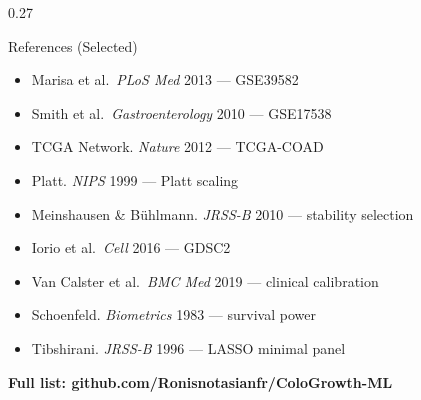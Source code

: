 \documentclass[final]{beamer}
\begin{document}
\begin{frame}[t]
\begin{columns}[t]
\begin{column}{0.27\textwidth}
\vspace*{0.15cm}

\begin{block}{References (Selected)}
\footnotesize
\begin{itemize}
\item Marisa et al.\ \emph{PLoS Med} 2013 --- GSE39582
\item Smith et al.\ \emph{Gastroenterology} 2010 --- GSE17538
\item TCGA Network. \emph{Nature} 2012 --- TCGA-COAD
\item Platt. \emph{NIPS} 1999 --- Platt scaling
\item Meinshausen \& B\"uhlmann. \emph{JRSS-B} 2010 --- stability selection
\item Iorio et al.\ \emph{Cell} 2016 --- GDSC2
\item Van Calster et al.\ \emph{BMC Med} 2019 --- clinical calibration
\item Schoenfeld. \emph{Biometrics} 1983 --- survival power
\item Tibshirani. \emph{JRSS-B} 1996 --- LASSO minimal panel
\end{itemize}
\textbf{Full list: github.com/Ronisnotasianfr/ColoGrowth-ML}
\end{block}
\end{column}

\end{columns}
\end{frame}
\end{document}

